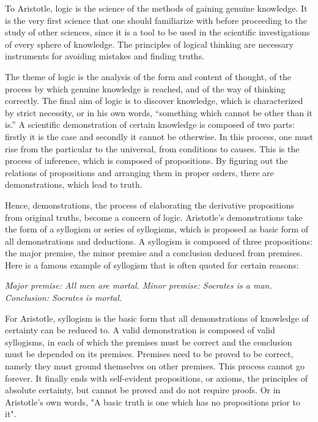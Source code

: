 \documentclass[11pt]{article}
\begin{document}
\newline

To Aristotle, logic is the science of the methods of gaining genuine knowledge. 
It is the very first science that one should familiarize with before proceeding to the study of other sciences, since it is a tool to be used in the scientific investigations of every sphere of knowledge. 
The principles of logical thinking are necessary instruments for avoiding mistakes and finding truths.  

\newline

The theme of logic is the analysis of the form and content of thought, of the process by which genuine knowledge is reached, and of the way of thinking correctly. 
The final aim of logic is to discover knowledge, which is characterized by strict necessity, or in his own words, “something which cannot be other than it is.” 
A scientific demonstration of certain knowledge is composed of two parts: 
firstly it is the case and secondly it cannot be otherwise. 
In this process, one must rise from the particular to the universal, from conditions to causes. 
This is the process of inference, which is composed of propositions. 
By figuring out the relations of propositions and arranging them in proper orders, there are demonstrations, which lead to truth.

\newline

Hence, demonstrations, the process of elaborating the derivative propositions from original truths, become a concern of logic. 
Aristotle’s demonstrations take the form of a syllogism or series of syllogisms, which is proposed as basic form of all demonstrations and deductions. 
A syllogism is composed of three propositions: 
the major premise, 
the minor premise and a conclusion deduced from premises. 
Here is a famous example of syllogism that is often quoted for certain reasons:

\newline

\textit{Major premise: All men are mortal.
\newline
Minor premise: Socrates is a man.
\newline
Conclusion: Socrates is mortal.}

\newline

For Aristotle, syllogism is the basic form that all demonstrations of knowledge of certainty can be reduced to. 
A valid demonstration is composed of valid syllogisms, in each of which the premises must be correct and the conclusion must be depended on its premises. 
Premises need to be proved to be correct, namely they must ground themselves on other premises. 
This process cannot go forever. 
It finally ends with self-evident propositions, or axioms, the principles of absolute certainty, but cannot be proved and do not require proofs. 
Or in Aristotle’s own words, "A basic truth is one which has no propositions prior to it".
\end{document}
